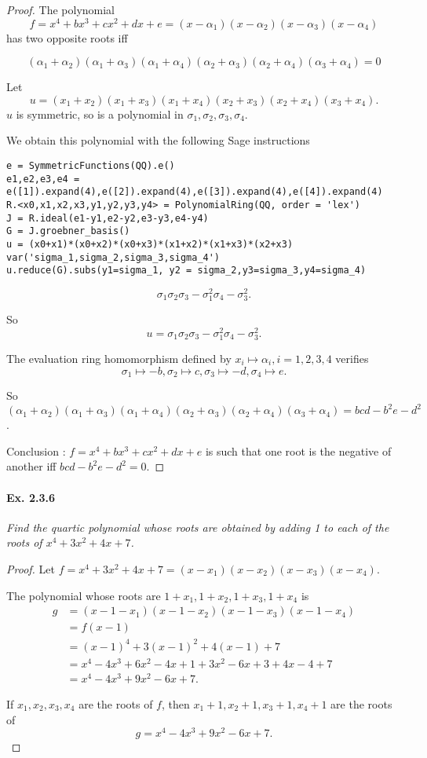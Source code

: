 \documentclass[11pt,a4paper]{article}
\begin{document}
\begin{proof}
The polynomial $$f = x^4+bx^3+cx^2+dx+e = (x-\alpha_1)(x-\alpha_2)(x-\alpha_3)(x-\alpha_4)$$ has two opposite roots iff

$$(\alpha_1+\alpha_2)(\alpha_1+\alpha_3)(\alpha_1+\alpha_4)(\alpha_2+\alpha_3)(\alpha_2+\alpha_4)(\alpha_3+\alpha_4)=0$$

Let $$u = (x_1+x_2)(x_1+x_3)(x_1+x_4)(x_2+x_3)(x_2+x_4)(x_3+x_4).$$ 
$u$ is symmetric, so  is a polynomial in $\sigma_1,\sigma_2,\sigma_3,\sigma_4$.

We obtain this polynomial with the following Sage instructions
\begin{verbatim}
e = SymmetricFunctions(QQ).e()
e1,e2,e3,e4 = e([1]).expand(4),e([2]).expand(4),e([3]).expand(4),e([4]).expand(4)
R.<x0,x1,x2,x3,y1,y2,y3,y4> = PolynomialRing(QQ, order = 'lex')
J = R.ideal(e1-y1,e2-y2,e3-y3,e4-y4)
G = J.groebner_basis()
u = (x0+x1)*(x0+x2)*(x0+x3)*(x1+x2)*(x1+x3)*(x2+x3)
var('sigma_1,sigma_2,sigma_3,sigma_4')
u.reduce(G).subs(y1=sigma_1, y2 = sigma_2,y3=sigma_3,y4=sigma_4)
\end{verbatim}
$$\sigma_{1} \sigma_{2} \sigma_{3} - \sigma_{1}^{2} \sigma_{4} -\sigma_{3}^{2}.$$

So 
$$u = \sigma_1\sigma_2\sigma_3 - \sigma_1^2\sigma_4 - \sigma_3^2.$$

The evaluation ring homomorphism defined by $x_i \mapsto \alpha_i, i=1,2,3,4$ verifies $$\sigma_1\mapsto -b, \sigma_2 \mapsto c, \sigma_3 \mapsto -d, \sigma_4\mapsto e.$$

So $(\alpha_1+\alpha_2)(\alpha_1+\alpha_3)(\alpha_1+\alpha_4)(\alpha_2+\alpha_3)(\alpha_2+\alpha_4)(\alpha_3+\alpha_4) = bcd - b^2e-d^2$.


Conclusion : 
$f = x^4+bx^3+cx^2+dx+e$ is such that one root is the negative of another iff $bcd - b^2e-d^2=0$.
\end{proof}

\paragraph{Ex. 2.3.6}

{\it Find the quartic polynomial whose roots are obtained by adding 1 to each of the roots of $x^4+3x^2+4x+7$.
}

\begin{proof}
Let $f  =  x^4+3x^2+4x+7 = (x-x_1)(x-x_2)(x-x_3)(x-x_4)$.

The polynomial whose roots are $1+x_1,1+x_2,1+x_3,1+x_4$ is
\begin{align*}
g &= (x-1-x_1)(x-1-x_2)(x-1-x_3)(x-1-x_4)\\
&=f(x-1)\\
&=(x-1)^4 + 3(x-1)^2 + 4(x-1)+7\\
&= x^4-4x^3+6x^2-4x+1+3x^2-6x+3 +4x-4+7\\
&=x^4-4x^3+9x^2-6x+7.
\end{align*}

If $x_1,x_2,x_3,x_4$ are the roots of $f$,  then  $x_1+1,x_2+1,x_3+1,x_4+1$ are the roots of
$$g = x^4-4x^3+9x^2-6x+7.$$
\end{proof}
\end{document}
